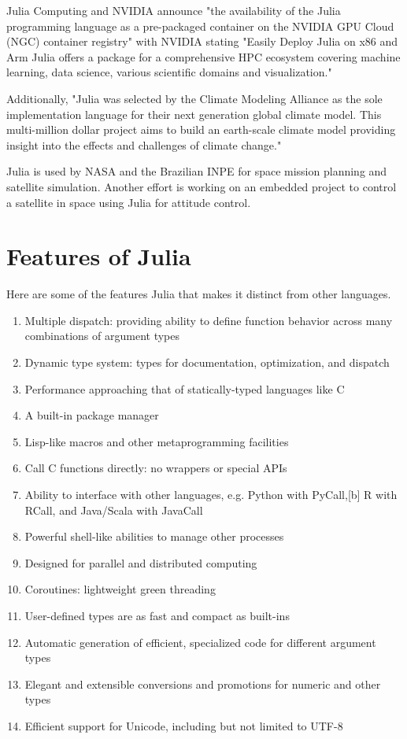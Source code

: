 \documentclass[a4paper,12pt,openany]{book}
\begin{document}
Julia Computing and NVIDIA announce "the availability of the Julia programming language as a pre-packaged container on the NVIDIA GPU Cloud (NGC) container registry" with NVIDIA stating "Easily Deploy Julia on x86 and Arm  Julia offers a package for a comprehensive HPC ecosystem covering machine learning, data science, various scientific domains and visualization."


Additionally, "Julia was selected by the Climate Modeling Alliance as the sole implementation language for their next generation global climate model. This multi-million dollar project aims to build an earth-scale climate model providing insight into the effects and challenges of climate change."


Julia is used by NASA and the Brazilian INPE for space mission planning and satellite simulation. Another effort is working on an embedded project to control a satellite in space using Julia for attitude control.

\section{Features of Julia}
Here are some of the features Julia that makes it distinct from other languages.
\begin{enumerate}
    \item Multiple dispatch: providing ability to define function behavior across many combinations of argument types
	\item Dynamic type system: types for documentation, optimization, and dispatch
	\item Performance approaching that of statically-typed languages like C
	\item A built-in package manager
	\item Lisp-like macros and other metaprogramming facilities
	\item Call C functions directly: no wrappers or special APIs
 	\item Ability to interface with other languages, e.g. Python with PyCall,[b] R with RCall, and Java/Scala with JavaCall
	\item Powerful shell-like abilities to manage other processes
	\item Designed for parallel and distributed computing
	\item Coroutines: lightweight green threading
	\item User-defined types are as fast and compact as built-ins
	\item Automatic generation of efficient, specialized code for different argument types
	\item Elegant and extensible conversions and promotions for numeric and other types
	\item Efficient support for Unicode, including but not limited to UTF-8
\end{enumerate}
\end{document}

